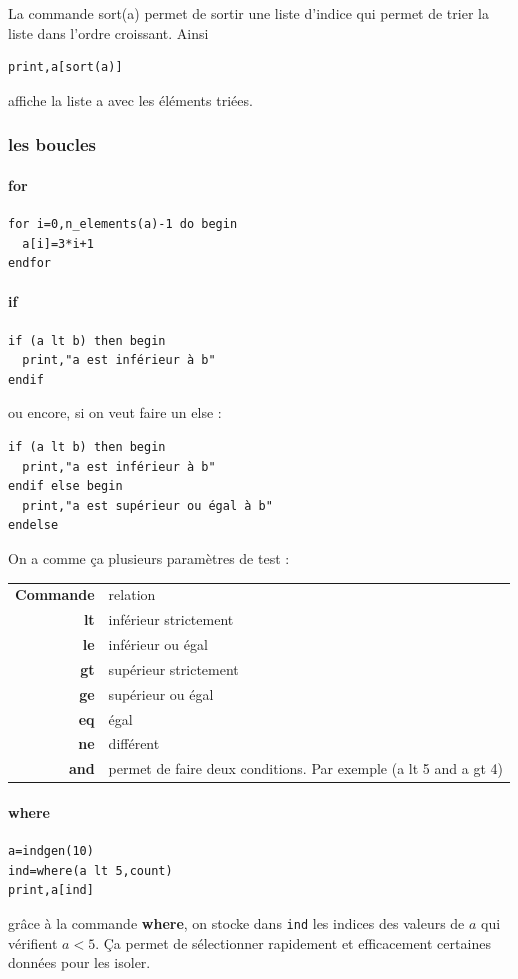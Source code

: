 \documentclass[a4paper,twoside]{article}
\begin{document}
\bigskip

La commande sort(a) permet de sortir une liste d'indice qui permet de trier la liste dans l'ordre croissant. Ainsi
\begin{verbatim}
print,a[sort(a)]
\end{verbatim}
affiche la liste a avec les éléments triées.

\subsubsection{les boucles}
\paragraph{for}
\begin{verbatim}
for i=0,n_elements(a)-1 do begin
  a[i]=3*i+1
endfor
\end{verbatim}


\paragraph{if}
\begin{verbatim}
if (a lt b) then begin
  print,"a est inférieur à b"
endif
\end{verbatim}

ou encore, si on veut faire un else :
\begin{verbatim}
if (a lt b) then begin
  print,"a est inférieur à b"
endif else begin
  print,"a est supérieur ou égal à b"
endelse
\end{verbatim}

On a comme ça plusieurs paramètres de test :

\begin{tabular}{>{\bfseries}r<{}@{ : }p{11cm}}
Commande &	relation\\
lt & inférieur strictement\\
le & inférieur ou égal\\
gt & supérieur strictement\\
ge & supérieur ou égal\\
eq & égal\\
ne & différent\\
and & permet de faire deux conditions. Par exemple (a lt 5 and a gt 4)
\end{tabular}

\paragraph{where}
\begin{verbatim}
a=indgen(10)
ind=where(a lt 5,count)
print,a[ind]
\end{verbatim}
grâce à la commande \textbf{where}, on stocke dans \texttt{ind} les indices des valeurs de $a$ qui vérifient $a < 5$. Ça permet de sélectionner rapidement et efficacement certaines données pour les isoler.
\end{document}

